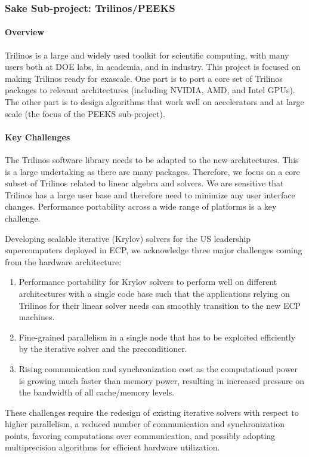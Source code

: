 \subsubsection{ Sake Sub-project: Trilinos/PEEKS} \label{subsubsect:trilinos}
\paragraph{Overview} 
Trilinos is a large and widely used toolkit for scientific computing, with many users both at DOE labs, in academia, and in industry. 
This project is focused on making Trilinos ready for exascale. One part is to port a core set of Trilinos packages to relevant architectures 
(including NVIDIA, AMD, and Intel GPUs). The other part is to design algorithms that work well on accelerators and at large scale (the focus of 
the PEEKS sub-project).


\paragraph{Key Challenges}
The Trilinos software library needs to be adapted to the new architectures. This is a large undertaking as there are many packages. Therefore, we focus on a core subset of Trilinos related to linear algebra and solvers. We are sensitive that Trilinos has a large user base and therefore need to minimize any user interface changes. Performance portability across a wide range of platforms is a key challenge.

Developing scalable iterative (Krylov) solvers for the US leadership supercomputers 
deployed in ECP, we acknowledge three major challenges coming from the hardware 
architecture:
\begin{enumerate}
\item 
Performance portability for Krylov solvers to perform well on different architectures with a single code base
such that the applications relying on Trilinos for their linear solver needs can smoothly transition to 
the new ECP machines.
\item 
Fine-grained parallelism in a single node that has to be exploited efficiently 
by the iterative solver and the preconditioner.
\item
Rising communication and synchronization cost as the
computational power is growing much faster than memory power, resulting in 
increased pressure on the bandwidth of all cache/memory levels.
\end{enumerate}

These challenges require the redesign of existing iterative solvers with respect 
to higher parallelism, a reduced number of 
communication and synchronization points, favoring computations over 
communication, and possibly adopting multiprecision algorithms for efficient hardware 
utilization. 


